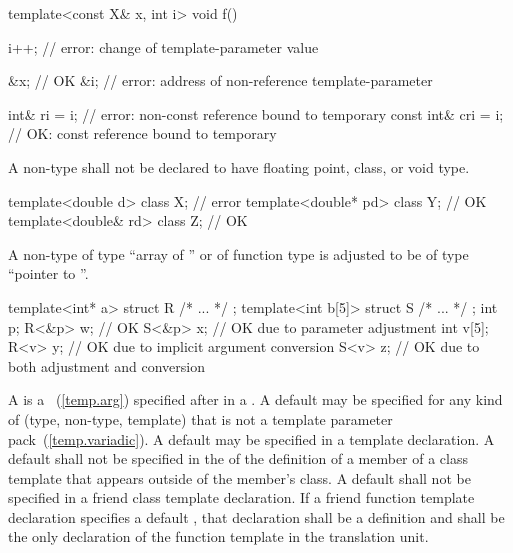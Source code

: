\begin{codeblock}
template<const X& x, int i> void f() {
  i++;                          // error: change of template-parameter value

  &x;                           // OK
  &i;                           // error: address of non-reference template-parameter

  int& ri = i;                  // error: non-const reference bound to temporary
  const int& cri = i;           // OK: const reference bound to temporary
}
\end{codeblock}
\exitexample

\pnum
A non-type
shall not be declared to have floating point, class, or void type.
\enterexample

\begin{codeblock}
template<double d> class X;     // error
template<double* pd> class Y;   // OK
template<double& rd> class Z;   // OK
\end{codeblock}
\exitexample

\pnum
A non-type
%
of type ``array of '' or
%
of function type 
is adjusted to be of type ``pointer to ''.
\enterexample

\begin{codeblock}
template<int* a>   struct R { /* ... */ };
template<int b[5]> struct S { /* ... */ };
int p;
R<&p> w;                        // OK
S<&p> x;                        // OK due to parameter adjustment
int v[5];
R<v> y;                         // OK due to implicit argument conversion
S<v> z;                         // OK due to both adjustment and conversion
\end{codeblock}
\exitexample

\pnum
A
is a
~(\ref{temp.arg}) specified after
\tcode{=}
in a
.
A default
may be specified for any kind of
(type, non-type, template)
that is not a template parameter pack~(\ref{temp.variadic}).
A default
may be specified in a template declaration.
A default
shall not be specified in the
of the definition of a member of a class template that appears outside
of the member's class.
A default
shall not be specified in a friend class template declaration.
If a friend function template declaration
specifies a default
,
that declaration shall be a definition and shall be the only declaration of
the function template in the translation unit.


